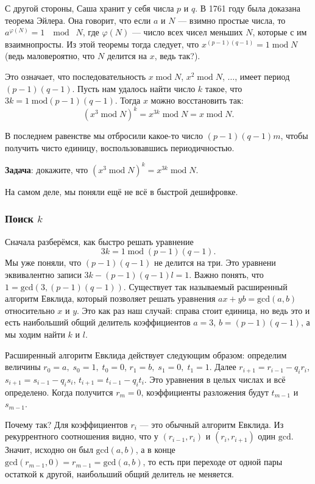 \documentclass[12pt]{article}
\begin{document}
С другой стороны, Саша хранит у себя числа $p$ и $q$. В 1761 году была доказана теорема Эйлера. Она говорит, что если $a$ и $N$ --- взимно простые числа, то $a^{\varphi(N)} = 1\;\mod\;N$, где $\varphi(N)$ --- число всех чисел меньших $N$, которые с им взаимнопросты. Из этой теоремы тогда следует, что $x^{(p  - 1)(q - 1)} = 1\;\mbox{mod}\;N$ (ведь маловероятно, что $N$ делится на $x$, ведь так?).

Это означает, что последовательность $x\;\mbox{mod}\;N$, $x^2\;\mbox{mod}\;N$, $\ldots$, имеет период $(p - 1)(q - 1)$. Пусть нам удалось найти число $k$ такое, что $3k = 1\;\mbox{mod}(p - 1)(q - 1)$. Тогда $x$ можно восстановить так:
$$(x^3\;\mbox{mod}\;N)^k = x^{3 k}\;\mbox{mod}\;N = x\;\mbox{mod}\;N.$$

В последнем равенстве мы отбросили какое-то число $(p - 1)(q - 1) m$, чтобы получить чисто единицу, воспользовавшись периодичностью.

{\bf Задача}: докажите, что $(x^3\;\mbox{mod}\;N)^k = x^{3 k}\;\mbox{mod}\;N$.

На самом деле, мы поняли ещё не всё в быстрой дешифровке.

\subsubsection*{Поиск $k$}
Сначала разберёмся, как быстро решать уравнение $$3 k = 1\;\mbox{mod}\;(p - 1)(q - 1).$$ Мы уже поняли, что $(p - 1)(q - 1)$ не делится на три. Это уравнени эквивалентно записи $3k - (p - 1)(q - 1) l = 1$. Важно понять, что $1 = \mbox{gcd}(3, (p - 1)(q - 1)).$ Существует так называемый расширенный алгоритм Евклида, который позволяет решать уравнения $a x + y b = \mbox{gcd}(a, b)$ относительно $x$ и $y$. Это как раз наш случай: справа стоит единица, но ведь это и есть наибольший общий делитель коэффициентов $a = 3$, $b = (p - 1)(q - 1)$, а мы ходим найти $k$ и $l$.

Расширенный алгоритм Евклида действует следующим образом: определим величины $r_0 = a,\;s_0 = 1,\;t_0 = 0$, $r_1 = b,\;s_1 = 0,\;t_1 = 1$. Далее $r_{i + 1} = r_{i - 1} - q_i r_i$, $s_{i + 1} = s_{i - 1} - q_i s_i$, $t_{i + 1} = t_{i - 1} - q_i t_i$. Это уравнения в целых числах и всё определено. Когда получится $r_m = 0$, коэффициенты разложения будут $t_{m - 1}$ и $s_{m - 1}$.

Почему так? Для коэффициентов $r_i$ --- это обычный алгоритм Евклида. Из рекуррентного соотношения видно, что у $(r_{i - 1}, r_i)$ и $(r_{i}, r_{i + 1})$ один $\mbox{gcd}$. Значит, исходно он был $\mbox{gcd}(a, b)$, а в конце $\mbox{gcd}(r_{m - 1}, 0) = r_{m - 1} = \mbox{gcd}(a, b)$, то есть при переходе от одной пары остаткой к другой, наибольший общий делитель не меняется.
\end{document}
